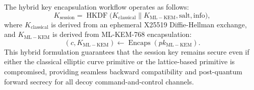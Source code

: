 \documentclass[journal,10pt]{IEEEtran}
\begin{document}
The hybrid key encapsulation workflow operates as follows:
\begin{equation}
  K_{\mathrm{session}} = \operatorname{HKDF}\bigl(K_{\mathrm{classical}} \parallel K_{\mathrm{ML-KEM}}, \text{salt}, \text{info}\bigr),
\end{equation}
where $K_{\mathrm{classical}}$ is derived from an ephemeral X25519 Diffie-Hellman exchange, and $K_{\mathrm{ML-KEM}}$ is derived from ML-KEM-768 encapsulation:
\begin{equation}
  (c, K_{\mathrm{ML-KEM}}) \leftarrow \operatorname{Encaps}(pk_{\mathrm{ML-KEM}}).
\end{equation}
This hybrid formulation guarantees that the session key remains secure even if either the classical elliptic curve primitive or the lattice-based primitive is compromised, providing seamless backward compatibility and post-quantum forward secrecy for all decoy command-and-control channels.
\end{document}
